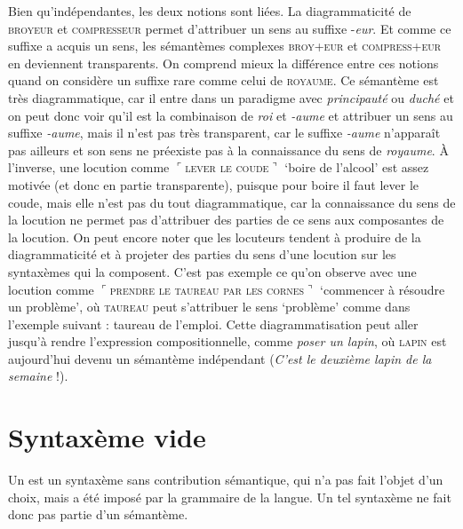 Bien qu’indépendantes, les deux notions sont liées. La diagrammaticité de \textsc{broyeur} et \textsc{compresseur} permet d’attribuer un sens au suffixe -\textit{eur}. Et comme ce suffixe a acquis un sens, les sémantèmes complexes \textsc{broy+eur} et \textsc{compress+eur} en deviennent transparents. On comprend mieux la différence entre ces notions quand on considère un suffixe rare comme celui de \textsc{royaume}. Ce sémantème est très diagrammatique, car il entre dans un paradigme avec \textit{principauté} ou \textit{duché} et on peut donc voir qu’il est la combinaison de \textit{roi} et \textit{{}-aume} et attribuer un sens au suffixe \textit{{}-aume}, mais il n’est pas très transparent, car le suffixe \textit{{}-aume} n’apparaît pas ailleurs et son sens ne préexiste pas à la connaissance du sens de \textit{royaume}. À l’inverse, une locution comme $⌜$\textsc{lever} \textsc{le} \textsc{coude}$⌝$ ‘boire de l’alcool’ est assez motivée (et donc en partie transparente), puisque pour boire il faut lever le coude, mais elle n’est pas du tout diagrammatique, car la connaissance du sens de la locution ne permet pas d’attribuer des parties de ce sens aux composantes de la locution. On peut encore noter que les locuteurs tendent à produire de la diagrammaticité et à projeter des parties du sens d’une locution sur les syntaxèmes qui la composent. C’est pas exemple ce qu’on observe avec une locution comme $⌜$\textsc{prendre} \textsc{le} \textsc{taureau} \textsc{par} \textsc{les} \textsc{cornes}$⌝$ ‘commencer à résoudre un problème’, où \textsc{taureau} peut s’attribuer le sens ‘problème’ comme dans l’exemple suivant :  taureau de l’emploi. Cette diagrammatisation peut aller jusqu’à rendre l’expression compositionnelle, comme \textit{poser un lapin}, où \textsc{lapin} est aujourd’hui devenu un sémantème indépendant (\textit{C’est le deuxième lapin de la semaine} !).

\section{Syntaxème vide}\label{sec:2.3.3}

{Un  est un syntaxème sans contribution sémantique, qui n’a pas fait l’objet d’un choix, mais a été imposé par la grammaire de la langue. Un tel syntaxème ne fait donc pas partie d’un sémantème.}

